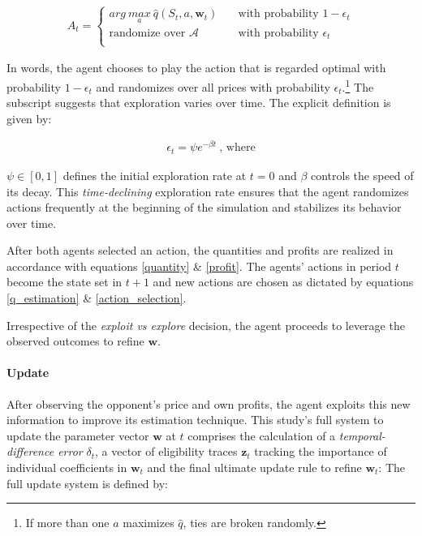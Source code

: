 \begin{gather}\label{action_selection}
 A_t = \begin{cases} arg ~\underset{a}{max} ~ \hat{q}(S_t,a,\boldsymbol{w}_t) & \quad \text{with probability } 1 - \epsilon_t\\
\text{randomize over } \mathcal{A} & \quad \text{with probability } \epsilon_t\\ \end{cases} 
\end{gather}

In words, the agent chooses to play the action that is regarded optimal with probability $1-\epsilon_t$ and randomizes over all prices with probability $\epsilon_t$.\footnote{If more than one $a$ maximizes $\hat{q}$, ties are broken randomly.} The subscript suggests that exploration varies over time. The explicit definition is given by:

\begin{gather}
	\epsilon_t = \psi e^{-\beta t}~ \text{, where}
\end{gather}

$\psi \in [0, 1]$ defines the initial exploration rate at $t = 0$ and $\beta$ controls the speed of its decay. This \emph{time-declining} exploration rate ensures that the agent randomizes actions frequently at the beginning of the simulation and stabilizes its behavior over time. 

After both agents selected an action, the quantities and profits are realized in accordance with equations \ref{quantity} \& \ref{profit}. The agents' actions in period $t$ become the state set in $t+1$ and new actions are chosen as dictated by equations \ref{q_estimation} \& \ref{action_selection}.

Irrespective of the \emph{exploit vs explore} decision, the agent proceeds to leverage the observed outcomes to refine $\boldsymbol{w}$.



\paragraph{Update}

After observing the opponent's price and own profits, the agent exploits this new information to improve its estimation technique. This study's full system to update the parameter vector $\boldsymbol{w}$ at $t$ comprises the calculation of a \emph{temporal-difference error} $\delta_t$, a vector of eligibility traces $\boldsymbol{z}_t$ tracking the importance of individual coefficients in $\boldsymbol{w}_t$ and the final ultimate update rule to refine $\boldsymbol{w}_t$: The full update system is defined by:

